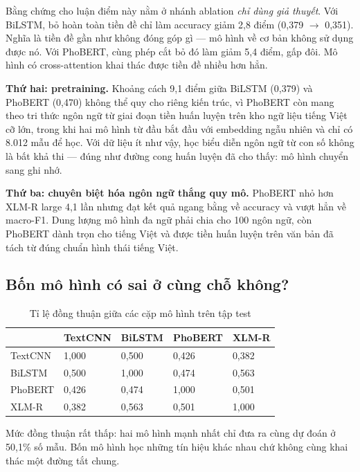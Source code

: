 \documentclass[12pt,a4paper,oneside]{report}
\begin{document}
Bằng chứng cho luận điểm này nằm ở nhánh ablation \textit{chỉ dùng giả thuyết}. Với
BiLSTM, bỏ hoàn toàn tiền đề chỉ làm accuracy giảm 2,8 điểm (0,379 $\rightarrow$ 0,351).
Nghĩa là tiền đề gần như không đóng góp gì --- mô hình về cơ bản không sử dụng được nó.
Với PhoBERT, cùng phép cắt bỏ đó làm giảm 5,4 điểm, gấp đôi. Mô hình có cross-attention
khai thác được tiền đề nhiều hơn hẳn.

\textbf{Thứ hai: pretraining.} Khoảng cách 9,1 điểm giữa BiLSTM (0,379) và PhoBERT (0,470)
không thể quy cho riêng kiến trúc, vì PhoBERT còn mang theo tri thức ngôn ngữ từ giai đoạn
tiền huấn luyện trên kho ngữ liệu tiếng Việt cỡ lớn, trong khi hai mô hình từ đầu bắt đầu
với embedding ngẫu nhiên và chỉ có 8.012 mẫu để học. Với dữ liệu ít như vậy, học biểu diễn
ngôn ngữ từ con số không là bất khả thi --- đúng như đường cong huấn luyện đã cho thấy: mô
hình chuyển sang ghi nhớ.

\textbf{Thứ ba: chuyên biệt hóa ngôn ngữ thắng quy mô.} PhoBERT nhỏ hơn XLM-R large 4,1
lần nhưng đạt kết quả ngang bằng về accuracy và vượt hẳn về macro-F1. Dung lượng mô hình
đa ngữ phải chia cho 100 ngôn ngữ, còn PhoBERT dành trọn cho tiếng Việt và được tiền huấn
luyện trên văn bản đã tách từ đúng chuẩn hình thái tiếng Việt.

\subsection{Bốn mô hình có sai ở cùng chỗ không?}

\begin{table}[H]
\centering
\small
\caption{Tỉ lệ đồng thuận giữa các cặp mô hình trên tập test}
\begin{tabularx}{\textwidth}{@{}L{3.5cm}C{2.2cm}C{2.2cm}C{2.2cm}C{2.2cm}@{}}
\toprule
 & \textbf{TextCNN} & \textbf{BiLSTM} & \textbf{PhoBERT} & \textbf{XLM-R} \\
\midrule
TextCNN  & 1,000 & 0,500 & 0,426 & 0,382 \\
BiLSTM   & 0,500 & 1,000 & 0,474 & 0,563 \\
PhoBERT  & 0,426 & 0,474 & 1,000 & 0,501 \\
XLM-R    & 0,382 & 0,563 & 0,501 & 1,000 \\
\bottomrule
\end{tabularx}
\end{table}

Mức đồng thuận rất thấp: hai mô hình mạnh nhất chỉ đưa ra cùng dự đoán ở 50,1\% số mẫu.
Bốn mô hình học những tín hiệu khác nhau chứ không cùng khai thác một đường tắt chung.
\end{document}
